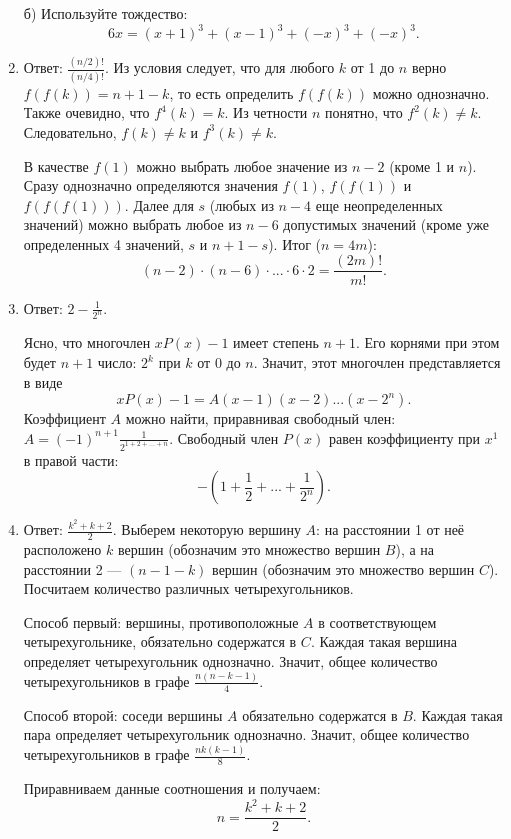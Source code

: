 \documentclass[11pt, a4paper]{article}
\begin{document}
\begin{enumerate}
б) Используйте тождество:
$$6x = (x+1)^3 + (x-1)^3 + (-x)^3 + (-x)^3.$$

\item Ответ: $\frac{(n/2)!}{(n/4)!}$. Из условия следует, что для любого $k$ от 1 до $n$ верно $f(f(k)) = n + 1 - k$, то есть определить $f(f(k))$ можно однозначно. Также очевидно, что $f^4(k) = k$. Из четности $n$ понятно, что $f^2(k) \neq k$. Следовательно, $f(k) \neq k$ и $f^3(k) \neq k$. 

В качестве $f(1)$ можно выбрать любое значение из $n-2$ (кроме 1 и $n$). Сразу однозначно определяются значения $f(1)$, $f(f(1))$ и $f(f(f(1)))$. Далее для $s$ (любых из $n-4$ еще неопределенных значений) можно выбрать любое из $n-6$ допустимых значений (кроме уже определенных 4 значений, $s$ и $n+1-s$). Итог ($n = 4m$):
$$(n-2) \cdot  (n-6) \cdot  ... \cdot  6 \cdot 2 = \frac{(2m)!}{m!}.$$

\item Ответ: $2 - \frac{1}{2^n}$.

Ясно, что многочлен $x P(x) - 1$ имеет степень $n+1$. Его корнями при этом будет $n+1$ число: $2^k$ при $k$ от $0$ до $n$. Значит, этот многочлен представляется в виде 
$$x P(x) - 1 = A (x - 1) (x - 2) ... (x - 2^n).$$
Коэффициент $A$ можно найти, приравнивая свободный член: $A = (-1)^{n+1} \frac{1}{2^{1+2+...+n}}$. Свободный член $P(x)$ равен коэффициенту при $x^1$ в правой части:
$$ - \left(1 + \frac{1}{2} + ... + \frac{1}{2^n} \right).$$

\item Ответ: $\frac{k^2 + k + 2}{2}$. Выберем некоторую вершину $A$: на расстоянии 1 от неё расположено $k$ вершин (обозначим это множество вершин $B$), а на расстоянии 2 ---  $(n - 1 - k)$ вершин (обозначим это множество вершин $C$). Посчитаем количество различных четырехугольников. 

Способ первый: вершины, противоположные $A$ в соответствующем четырехугольнике, обязательно содержатся в $C$. Каждая такая вершина определяет четырехугольник однозначно. Значит, общее количество четырехугольников в графе $\frac{n(n-k-1)}{4}$.

Способ второй: соседи вершины $A$ обязательно содержатся в $B$. Каждая такая пара определяет четырехугольник однозначно. Значит, общее количество четырехугольников в графе $\frac{nk(k-1)}{8}$.

Приравниваем данные соотношения и получаем:
$$n = \frac{k^2 + k + 2}{2}.$$

\end{enumerate}
\end{document}
